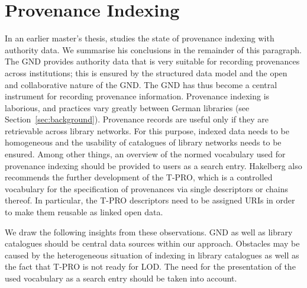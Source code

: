 %
%
%
\section{Provenance Indexing}
\label{sec:provenance_indexing}

In an earlier master's thesis, \textcite{Hakelberg2016}
studies the state of provenance indexing with authority data.
We summarise his conclusions in the remainder of this paragraph.
The \gls{GND} provides authority data that is
very suitable for recording provenances across institutions;
this is ensured by the structured data model
and the open and collaborative nature of the \gls{GND}.
The \gls{GND} has thus become a central instrument for recording
provenance information.
Provenance indexing is laborious, and
practices vary greatly between German libraries (see Section~\ref{sec:background}).
Provenance records are useful only if
they are retrievable across library networks.
For this purpose, indexed data needs to be homogeneous
and the usability of catalogues of library networks needs to be ensured.
Among other things, an overview
of the normed vocabulary used for provenance indexing
should be provided to users as a search entry.
Hakelberg also recommends the further development of the \gls{T-PRO},
which is a controlled vocabulary
for the specification of provenances via single descriptors or chains thereof.
In particular, the T-PRO descriptors need to be assigned \glspl{URI}
in order to make them reusable as linked open data. %

We draw the following insights from these observations.
\gls{GND} as well as library catalogues should be central data sources within our approach.
Obstacles may be caused by
the heterogeneous situation of indexing in library catalogues
as well as the fact that T-PRO is not ready for LOD.
The need for the presentation of the used vocabulary as a search entry
should be taken into account.

%
%

